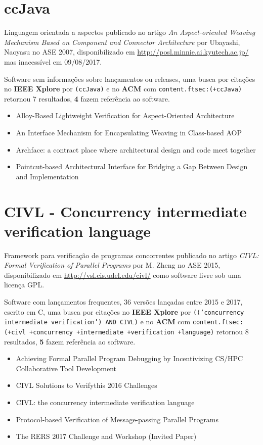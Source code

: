 \section{ccJava}

Linguagem orientada a aspectos
publicado no artigo {\it An Aspect-oriented Weaving Mechanism Based on Component and Connector Architecture}
por Ubayashi, Naoyasu
no ASE 2007,
disponibilizado em \url{http://posl.minnie.ai.kyutech.ac.jp/}
mas inacessível em 09/08/2017.

Software sem informações sobre lançamentos ou releases,
uma busca por citações no {\bf IEEE Xplore} por
\texttt{(ccJava)}
e no {\bf ACM} com
\texttt{content.ftsec:(+ccJava)}
retornou
7 resultados,
{\bf 4} fazem referência ao software.

\begin{itemize}
\item Alloy-Based Lightweight Verification for Aspect-Oriented Architecture
\item An Interface Mechanism for Encapsulating Weaving in Class-based AOP
\item Archface: a contract place where architectural design and code meet together
\item Pointcut-based Architectural Interface for Bridging a Gap Between Design and Implementation
\end{itemize}

\section{CIVL - Concurrency intermediate verification language}

Framework para verificação de programas concorrentes
publicado no artigo {\it CIVL: Formal Verification of Parallel Programs}
por M. Zheng
no ASE 2015,
disponibilizado em \url{http://vsl.cis.udel.edu/civl/}
como software livre
sob uma licença GPL.

Software com lançamentos frequentes,
36 versões lançadas
entre 2015 e 2017,
escrito em C,
uma busca por citações no {\bf IEEE Xplore} por
\texttt{(('concurrency intermediate verification') AND CIVL)}
e no {\bf ACM} com
\texttt{content.ftsec:(+civl +concurrency +intermediate +verification +language)}
retornou
8 resultados,
{\bf 5} fazem referência ao software.

\begin{itemize}
\item Achieving Formal Parallel Program Debugging by Incentivizing CS/HPC Collaborative Tool Development
\item CIVL Solutions to Verifythis 2016 Challenges
\item CIVL: the concurrency intermediate verification language
\item Protocol-based Verification of Message-passing Parallel Programs
\item The RERS 2017 Challenge and Workshop (Invited Paper)
\end{itemize}

